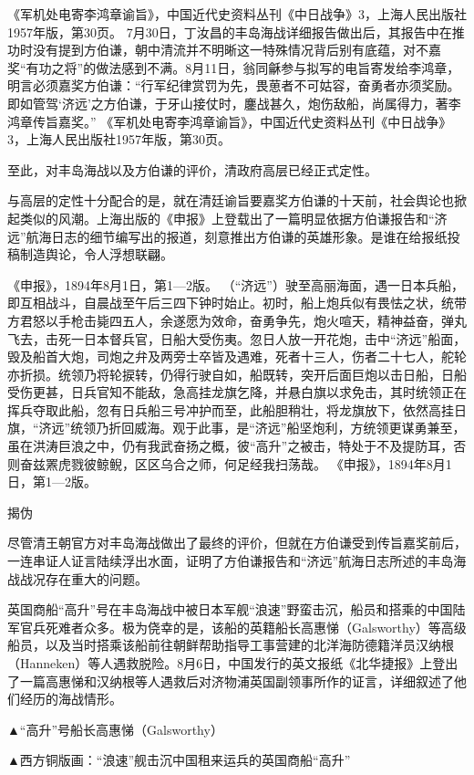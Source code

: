 \documentclass[12pt,UTF8]{ctexbook}
\begin{document}
《军机处电寄李鸿章谕旨》，中国近代史资料丛刊《中日战争》3，上海人民出版社1957年版，第30页。
7月30日，丁汝昌的丰岛海战详细报告做出后，其报告中在推功时没有提到方伯谦，朝中清流并不明晰这一特殊情况背后别有底蕴，对不嘉奖“有功之将”的做法感到不满。8月11日，翁同龢参与拟写的电旨寄发给李鸿章，明言必须嘉奖方伯谦：“行军纪律赏罚为先，畏葸者不可姑容，奋勇者亦须奖励。即如管驾‘济远’之方伯谦，于牙山接仗时，鏖战甚久，炮伤敌船，尚属得力，著李鸿章传旨嘉奖。” 《军机处电寄李鸿章谕旨》，中国近代史资料丛刊《中日战争》3，上海人民出版社1957年版，第30页。

至此，对丰岛海战以及方伯谦的评价，清政府高层已经正式定性。

与高层的定性十分配合的是，就在清廷谕旨要嘉奖方伯谦的十天前，社会舆论也掀起类似的风潮。上海出版的《申报》上登载出了一篇明显依据方伯谦报告和“济远”航海日志的细节编写出的报道，刻意推出方伯谦的英雄形象。是谁在给报纸投稿制造舆论，令人浮想联翩。

《申报》，1894年8月1日，第1—2版。
（“济远”）驶至高丽海面，遇一日本兵船，即互相战斗，自晨战至午后三四下钟时始止。初时，船上炮兵似有畏怯之状，统带方君怒以手枪击毙四五人，余遂愿为效命，奋勇争先，炮火喧天，精神益奋，弹丸飞去，击死一日本督兵官，日船大受伤夷。忽日人放一开花炮，击中“济远”船面，毁及船首大炮，司炮之弁及两旁士卒皆及遇难，死者十三人，伤者二十七人，舵轮亦折损。统领乃将轮捩转，仍得行驶自如，船既转，突开后面巨炮以击日船，日船受伤更甚，日兵官知不能敌，急高挂龙旗乞降，并悬白旗以求免击，其时统领正在挥兵夺取此船，忽有日兵船三号冲护而至，此船胆稍壮，将龙旗放下，依然高挂日旗，“济远”统领乃折回威海。观于此事，是“济远”船坚炮利，方统领更谋勇兼至，虽在洪涛巨浪之中，仍有我武奋扬之概，彼“高升”之被击，特处于不及提防耳，否则奋兹罴虎戮彼鲸鲵，区区乌合之师，何足经我扫荡哉。 《申报》，1894年8月1日，第1—2版。

揭伪

尽管清王朝官方对丰岛海战做出了最终的评价，但就在方伯谦受到传旨嘉奖前后，一连串证人证言陆续浮出水面，证明了方伯谦报告和“济远”航海日志所述的丰岛海战战况存在重大的问题。

英国商船“高升”号在丰岛海战中被日本军舰“浪速”野蛮击沉，船员和搭乘的中国陆军官兵死难者众多。极为侥幸的是，该船的英籍船长高惠悌（Galsworthy）等高级船员，以及当时搭乘该船前往朝鲜帮助指导工事营建的北洋海防德籍洋员汉纳根（Hanneken）等人遇救脱险。8月6日，中国发行的英文报纸《北华捷报》上登出了一篇高惠悌和汉纳根等人遇救后对济物浦英国副领事所作的证言，详细叙述了他们经历的海战情形。


▲“高升”号船长高惠悌（Galsworthy）


▲西方铜版画：“浪速”舰击沉中国租来运兵的英国商船“高升”
\end{document}
